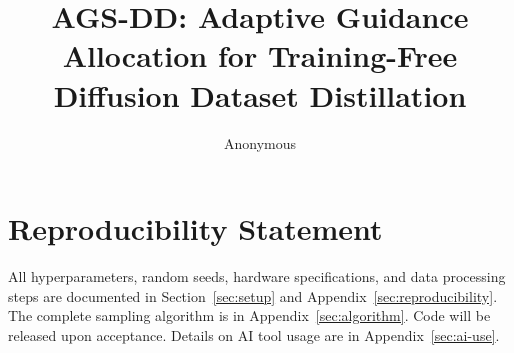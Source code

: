 \documentclass{article}
\title{AGS-DD: Adaptive Guidance Allocation for Training-Free Diffusion Dataset Distillation}
\author{Anonymous}
\begin{document}
\maketitle











\section*{Reproducibility Statement}
All hyperparameters, random seeds, hardware specifications, and data processing steps are documented in Section~\ref{sec:setup} and Appendix~\ref{sec:reproducibility}. The complete sampling algorithm is in Appendix~\ref{sec:algorithm}. Code will be released upon acceptance. Details on AI tool usage are in Appendix~\ref{sec:ai-use}.




\newpage
\appendix










\end{document}
